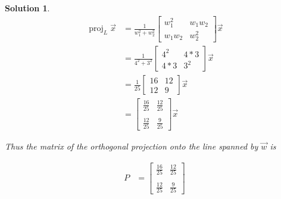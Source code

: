 \documentclass{article}
\newtheorem*{solution}{Solution}
\DeclareMathOperator{\proj}{proj}
\newcommand{\vectorproj}[2][]{\proj_{#1}#2}
\begin{document}
\begin{solution}
\begin{align*}
\vectorproj[L]{\vec{x}} &= \frac{1}{w_{1}^2 + w_{2}^2} \begin{bmatrix} w_{1}^2 & w_{1}w_{2} \\ w_{1}w_{2} & w_{2}^2\end{bmatrix} \vec{x} \\
&= \frac{1}{4^2 + 3^2} \begin{bmatrix} 4^2 & 4*3 \\ 4*3 & 3^2\end{bmatrix} \vec{x} \\
&= \frac{1}{25} \begin{bmatrix} 16 & 12 \\ 12 & 9\end{bmatrix} \vec{x} \\
&= \begin{bmatrix} \frac{16}{25} & \frac{12}{25} \\ \\ \frac{12}{25} & \frac{9}{25}\end{bmatrix} \vec{x} 
\end{align*}

Thus the matrix of the orthogonal projection onto the line spanned by $\vec{w}$ is

\begin{align*}
P &= \begin{bmatrix} \frac{16}{25} & \frac{12}{25} \\ \\ \frac{12}{25} & \frac{9}{25}\end{bmatrix}
\end{align*}
\end{solution}
\end{document}
